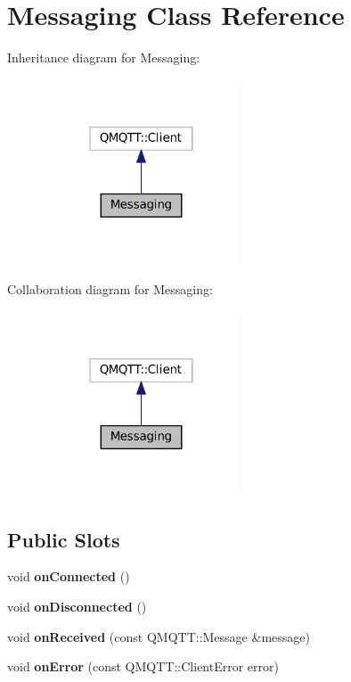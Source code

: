 \hypertarget{classMessaging}{}\section{Messaging Class Reference}
\label{classMessaging}


Inheritance diagram for Messaging\+:
\nopagebreak
\begin{figure}[H]
\begin{center}
\leavevmode
\includegraphics[width=166pt]{classMessaging__inherit__graph}
\end{center}
\end{figure}


Collaboration diagram for Messaging\+:
\nopagebreak
\begin{figure}[H]
\begin{center}
\leavevmode
\includegraphics[width=166pt]{classMessaging__coll__graph}
\end{center}
\end{figure}
\subsection*{Public Slots}
\begin{DoxyCompactItemize}
\item 
\mbox{\label{classMessaging_a227ca5e4baff6847a581e469859a3be9}} 
void {\bfseries on\+Connected} ()
\item 
\mbox{\label{classMessaging_a482b88293ce9f86f2eaca43c3b71f27f}} 
void {\bfseries on\+Disconnected} ()
\item 
\mbox{\label{classMessaging_a298a8bcf6b1fa289d98508244c46c9ff}} 
void {\bfseries on\+Received} (const Q\+M\+Q\+T\+T\+::\+Message \&message)
\item 
\mbox{\label{classMessaging_a66df1b71b97968f743cca15a5ac5a858}} 
void {\bfseries on\+Error} (const Q\+M\+Q\+T\+T\+::\+Client\+Error error)
\end{DoxyCompactItemize}

